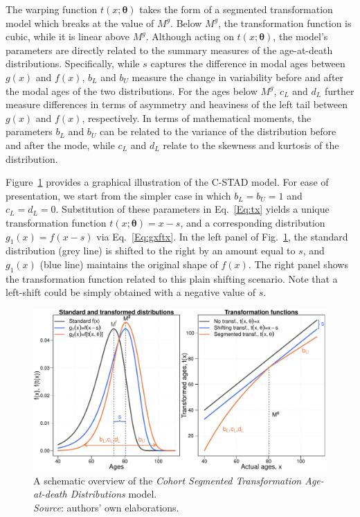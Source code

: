 \documentclass[11pt, a4paper]{article}
\begin{document}
The warping function $t(x;\bm{\theta})$ takes the form of a segmented transformation model which breaks at the value of $M^{g}$. Below $M^{g}$, the transformation function is cubic, while it is linear above $M^{g}$. Although acting on $t(x;\bm{\theta})$, the model's parameters are directly related to the summary measures of the age-at-death distributions. Specifically, while $s$ captures the difference in modal ages between $g(x)$ and $f(x)$, $b_L$ and $b_U$ measure the change in variability before and after the modal ages of the two distributions. For the ages below $M^{g}$, $c_L$ and $d_L$ further measure differences in terms of asymmetry and heaviness of the left tail between $g(x)$ and $f(x)$, respectively. In terms of mathematical moments, the parameters $b_L$ and $b_U$ can be related to the variance of the distribution before and after the mode, while $c_L$ and $d_L$ relate to the skewness and kurtosis of the distribution. 

Figure~\ref{Fig:CSTADmodel} provides a graphical illustration of the C-STAD model. For ease of presentation, we start from the simpler case in which $b_L = b_U = 1$ and $c_L = d_L = 0$. Substitution of these parameters in Eq.~\eqref{Eq:tx} yields a unique transformation function $t(x;\bm{\theta})=x-s$, and a corresponding distribution $g_1(x) = f(x-s)$ via Eq.~\eqref{Eq:gxftx}. In the left panel of Fig.~\ref{Fig:CSTADmodel}, the standard distribution (grey line) is shifted to the right by an amount equal to $s$, and $g_1(x)$ (blue line) maintains the original shape of $f(x)$. The right panel shows the transformation function related to this plain shifting scenario. Note that a left-shift could be simply obtained with a negative value of $s$. 

\begin{figure}[t]
	\begin{center}
		\includegraphics[scale=0.57]{./Figures/F2.pdf} 
		\caption{A schematic overview of the \emph{Cohort Segmented Transformation Age-at-death Distributions} model.\\
		\small \textit{Source}: authors' own elaborations. \label{Fig:CSTADmodel}}    
	\end{center}
\end{figure}
\end{document}

